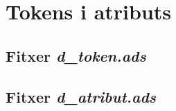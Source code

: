 \section{Tokens i atributs}

\subsection{Fitxer \emph{d\_token.ads}}

\newpage

\subsection{Fitxer \emph{d\_atribut.ads}}

\newpage
